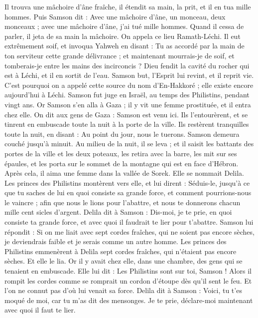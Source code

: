 \begin{multicols}{2}
Il trouva une mâchoire d'âne fraîche, il étendit sa main, la prit, et il en tua mille hommes.
Puis Samson dit : Avec une mâchoire d'âne, un monceau, deux monceaux ; avec une mâchoire d'âne, j'ai tué mille hommes.
Quand il cessa de parler, il jeta de sa main la mâchoire. On appela ce lieu Ramath-Léchi.
Il eut extrêmement soif, et invoqua Yahweh en disant : Tu as accordé par la main de ton serviteur cette grande délivrance ; et maintenant mourrais-je de soif, et tomberais-je entre les mains des incirconcis ?
Dieu fendit la cavité du rocher qui est à Léchi, et il en sortit de l'eau. Samson but, l'Esprit lui revint, et il reprit vie. C'est pourquoi on a appelé cette source du nom d'En-Hakkoré ; elle existe encore aujourd'hui  à Léchi.
Samson fut juge en Israël, au temps des Philistins, pendant vingt ans.
\VerseOne{}Or Samson s'en alla à Gaza ; il y vit une femme prostituée, et il entra chez elle.
On dit aux gens de Gaza : Samson est venu ici. Ils l'entourèrent, et se tinrent en embuscade toute la nuit à la porte de la ville. Ils restèrent tranquilles toute la nuit, en disant : Au point du jour, nous le tuerons.
Samson demeura couché jusqu'à minuit. Au milieu de la nuit, il se leva ; et il saisit les battants des portes de la ville et les deux poteaux, les retira avec la barre, les mit sur ses épaules, et les porta sur le sommet de la montagne qui est en face d'Hébron.
Après cela, il aima une femme dans la vallée de Sorek. Elle se nommait Delila.
Les princes des Philistins montèrent vers elle, et lui dirent : Séduis-le, jusqu'à ce que tu saches de lui en quoi consiste sa grande force, et comment pourrions-nous le vaincre ; afin que nous le lions pour l'abattre, et nous te donnerons chacun mille cent sicles d'argent.
Delila dit à Samson : Dis-moi, je te prie, en quoi consiste ta grande force, et avec quoi il faudrait te lier pour t'abattre.
Samson lui répondit : Si on me liait avec sept cordes fraîches, qui ne soient pas encore sèches, je deviendrais faible et je serais comme un autre homme.
Les princes des Philistins emmenèrent à Delila sept cordes fraîches, qui n'étaient pas encore sèches. Et elle le lia.
Or il y avait chez elle, dans une chambre, des gens qui se tenaient en embuscade. Elle lui dit : Les Philistins sont sur toi, Samson ! Alors il rompit les cordes comme se romprait un cordon d'étoupe dès qu'il sent le feu. Et l'on ne connut pas d'où lui venait sa force.
Delila dit à Samson : Voici, tu t'es moqué de moi, car tu m'as dit des mensonges. Je te prie, déclare-moi maintenant avec quoi il faut te lier.

\end{multicols}
